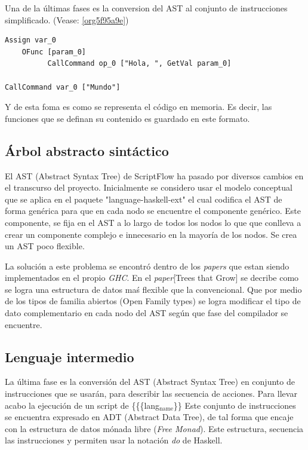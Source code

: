 \documentclass[11pt]{article}
\begin{document}
Una de la últimas fases es la conversion del AST al conjunto de
instrucciones simplificado. (Vease: \ref{org5f95a9e})

\begin{verbatim}
Assign var_0
    OFunc [param_0]
          CallCommand op_0 ["Hola, ", GetVal param_0]

CallCommand var_0 ["Mundo"]
\end{verbatim}

Y de esta foma es como se representa el código en memoria. Es decir, las
funciones que se definan su contenido es guardado en este formato.

\subsection{Árbol abstracto sintáctico}
\label{sec:orgdb43592}

El AST (Abstract Syntax Tree) de ScriptFlow ha pasado por diversos cambios en el transcurso del proyecto. Inicialmente
se considero usar el modelo conceptual que se aplica en el paquete "language-haskell-ext" el cual codifica el AST de forma genérica
para que en cada nodo se encuentre el componente genérico. Este componente, se fija en el AST a lo largo de todos los nodos lo que
que conlleva a crear un componente complejo e innecesario en la mayoría de los nodos. Se crea un AST poco flexible.

La solución a este problema se encontró dentro de los \emph{papers} que estan siendo implementados en el propio \emph{GHC}. En el \emph{paper}[Trees that Grow]
se decribe como se logra una estructura de datos maś flexible que la convencional. Que por medio de los tipos de familia abiertos (Open Family types)
se logra modificar el tipo de dato complementario en cada nodo del AST según que fase del compilador se encuentre.

\subsection{Lenguaje intermedio}
\label{sec:org7939ef6}

\label{org5f95a9e} La última fase es la conversión del AST (Abstract Syntax Tree) en conjunto de instrucciones
que se usarán, para describir las secuencia de acciones. Para llevar acabo la ejecución de un script de \{\{\{lang\(_{\text{name}}\)\}\}
Este conjunto de instrucciones se encuentra expresado en ADT (Abstract Data Tree), de tal forma que encaje con la estructura
de datos mónada libre (\emph{Free Monad}). Este estructura, secuencia las instrucciones y permiten usar la notación \emph{do} de Haskell.
\end{document}
